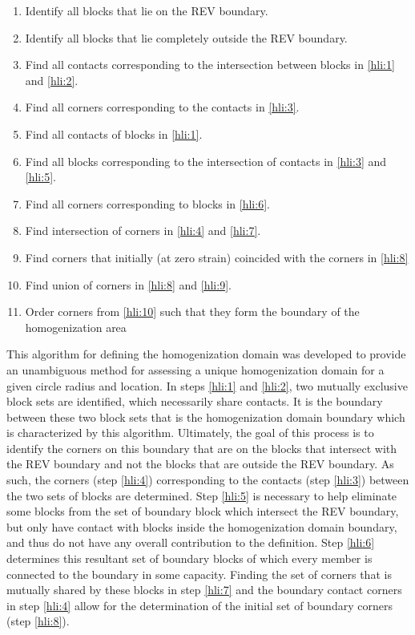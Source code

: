 \begin{enumerate}
\item \label{hli:1} Identify all blocks that lie on the REV boundary. 
\item \label{hli:2} Identify all blocks that lie completely outside the
REV boundary. 
\item \label{hli:3} Find all contacts corresponding to the intersection
between blocks in \ref{hli:1} and \ref{hli:2}. 
\item \label{hli:4} Find all corners corresponding to the contacts in \ref{hli:3}. 
\item \label{hli:5} Find all contacts of blocks in \ref{hli:1}. 
\item \label{hli:6} Find all blocks corresponding to the intersection of
contacts in \ref{hli:3} and \ref{hli:5}. 
\item \label{hli:7} Find all corners corresponding to blocks in \ref{hli:6}. 
\item \label{hli:8} Find intersection of corners in \ref{hli:4} and \ref{hli:7}. 
\item \label{hli:9} Find corners that initially (at zero strain) coincided
with the corners in \ref{hli:8} 
\item \label{hli:10} Find union of corners in \ref{hli:8} and \ref{hli:9}. 
\item \label{hli:11} Order corners from \ref{hli:10} such that they form
the boundary of the homogenization area
\end{enumerate}
This algorithm for defining the homogenization domain was developed
to provide an unambiguous method for assessing a unique homogenization
domain for a given circle radius and location. In steps \ref{hli:1}
and \ref{hli:2}, two mutually exclusive block sets are identified,
which necessarily share contacts. It is the boundary between these
two block sets that is the homogenization domain boundary which is
characterized by this algorithm. Ultimately, the goal of this process
is to identify the corners on this boundary that are on the blocks
that intersect with the REV boundary and not the blocks that are outside
the REV boundary. As such, the corners (step \ref{hli:4}) corresponding
to the contacts (step \ref{hli:3}) between the two sets of blocks
are determined. Step \ref{hli:5} is necessary to help eliminate some
blocks from the set of boundary block which intersect the REV boundary,
but only have contact with blocks inside the homogenization domain
boundary, and thus do not have any overall contribution to the definition.
Step \ref{hli:6} determines this resultant set of boundary blocks
of which every member is connected to the boundary in some capacity.
Finding the set of corners that is mutually shared by these blocks
in step \ref{hli:7} and the boundary contact corners in step \ref{hli:4}
allow for the determination of the initial set of boundary corners
(step \ref{hli:8}).

